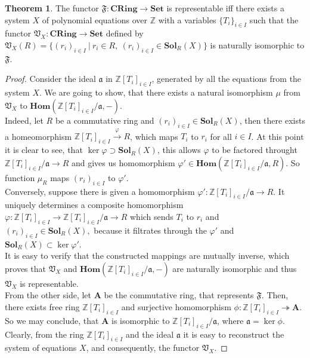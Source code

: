 \documentclass{article}
\theoremstyle{definition}
\theoremstyle{definition}
\newtheorem{theorem}{Theorem}
\begin{document}
\begin{theorem}
The functor $\mathfrak{F}:\mathbf{CRing}\xrightarrow{}\mathbf{Set}$ is representable iff there exists a system $X$ of polynomial 
equations over $\mathbb{Z}$ with a variables $\{T_i\}_{i\in I}$ such that the functor 
$\mathfrak{V}_X : \mathbf{CRing} \xrightarrow{} \mathbf{Set}$ defined by $\mathfrak{V}_X(R) = 
\{(r_i)_{i\in I} \ | \ r_i \in R, \ (r_i)_{i\in I} \in \mathbf{Sol}_R(X)\}$ is naturally isomorphic to $\mathfrak{F}$.
\end{theorem}

\begin{proof}
Consider the ideal $\mathfrak{a}$ in $\mathbb{Z}[T_i]_{i \in I}$, generated by all the equations from the system $X$. We are 
going to show, that there exists a natural isomorphism 
$\mu$ from $\mathfrak{V}_X$ to $\mathbf{Hom}(\mathbb{Z}[T_i]_{i \in I}/\mathfrak{a}, -) $.\\
Indeed, let $R$ be a commutative ring and $(r_i)_{i\in I} \in \mathbf{Sol}_R(X)$, then there exists a homeomorphism 
$\mathbb{Z}[T_i]_{i\in I}\xrightarrow{\varphi} R$, which maps $T_i$ to $r_i$ for all $i \in I$. At this point it is clear to see, 
that $\operatorname{ker} \varphi \supset \mathbf{Sol}_R(X)$, this allows $\varphi$ to be factored throught 
$\mathbb{Z}[T_i]_{i\in I}/\mathfrak{a} \xrightarrow{} R$ and gives us homomorphism 
$\varphi '\in \mathbf{Hom}(\mathbb{Z}[T_i]_{i \in I}/\mathfrak{a}, R)$. So function $\mu_R$ maps $(r_i)_{i\in I}$ to $\varphi '$.\\
Conversely, suppose there is given a homomorphism $\varphi ': \mathbb{Z}[T_i]_{i\in I}/\mathfrak{a}\xrightarrow{} R$. 
It uniquely determines a composite homomorphism
 $\varphi : \mathbb{Z}[T_i]_{i\in I}\xrightarrow{}\mathbb{Z}[T_i]_{i\in I}/\mathfrak{a}\xrightarrow{} R$ which sends 
 $T_i$ to $r_i$ and $(r_i)_{i\in I} \in\mathbf{Sol}_R(X),$ because it filtrates through the $\varphi '$ and 
 $  \mathbf{Sol}_R(X) \subset \operatorname{ker} \varphi '$.\\
It is easy to verify that the constructed mappings are mutually inverse, which proves that $\mathfrak{V}_X$ and 
$\mathbf{Hom}(\mathbb{Z}[T_i]_{i \in I}/\mathfrak{a}, -) $ are naturally isomorphic and thus $\mathfrak{V}_X$ is representable.\\
From the other side, let $\mathbf{A}$ be the commutative ring, that represents $\mathfrak{F}.$ Then, there exists free ring 
$\mathbb{Z}[T_i]_{i \in I}$ and surjective homomorphism $\phi:\mathbb{Z}[T_i]_{i \in I}\twoheadrightarrow \mathbf{A}$.
 So we may conclude, that $\mathbf{A}$ is isomorphic to $\mathbb{Z}[T_i]_{i \in I}/\mathfrak{a}$, where 
 $\mathfrak{a}=\operatorname{ker}\phi$. Clearly, from the ring $\mathbb{Z}[T_i]_{i\in I}$ and the ideal $\mathfrak{a}$ it is easy
  to reconstruct the system of equations $X$, and consequently, the functor $\mathfrak{V}_X.$
\end{proof}
\end{document}

